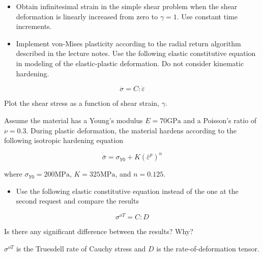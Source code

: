 \begin{itemize}
    \item Obtain infinitesimal strain in the simple shear problem when the shear deformation is linearly increased from zero to $\gamma = 1$. Use constant time increments.
    \item Implement von-Mises plasticity according to the radial return algorithm described in the lecture notes. Use the following elastic constitutive equation in modeling of the elastic-plastic deformation. Do not consider kinematic hardening.
\end{itemize}

\begin{equation}
    \dot{\sigma} = C : \dot{\varepsilon}
\end{equation}

Plot the shear stress as a function of shear strain, $\gamma$.

Assume the material has a Young's modulus $E = 70 \text{GPa}$ and a Poisson's ratio of $\nu = 0.3$.
During plastic deformation, the material hardens according to the following isotropic hardening equation

\begin{equation}
    \bar{\sigma} = \sigma_{Y0} + K (\bar{\varepsilon}^p)^n
\end{equation}

where $\sigma_{Y0} = 200 \text{MPa}$, $K = 325 \text{MPa}$, and $n = 0.125$.

\begin{itemize}
    \item Use the following elastic constitutive equation instead of the one at the second request and compare the
    results
\end{itemize}

\begin{equation}
    \sigma^{oT} = C : D
\end{equation}

Is there any significant difference between the results? Why?

$\sigma^{oT}$ is the Truesdell rate of Cauchy stress and $D$ is the rate-of-deformation tensor.

